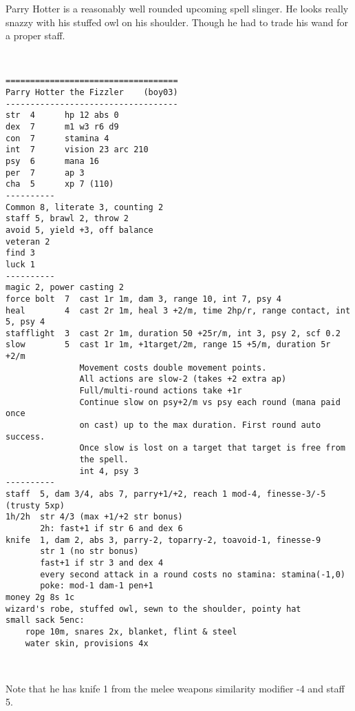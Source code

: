 \clearpage
\begin{samepage}

\noindent Parry Hotter is a reasonably well rounded upcoming spell slinger. He looks really snazzy with his stuffed owl on his shoulder. Though he had to trade his wand for a proper staff.

\

\small \begin{verbatim}
===================================
Parry Hotter the Fizzler    (boy03)
-----------------------------------
str  4      hp 12 abs 0
dex  7      m1 w3 r6 d9
con  7      stamina 4
int  7      vision 23 arc 210
psy  6      mana 16
per  7      ap 3
cha  5      xp 7 (110)
----------
Common 8, literate 3, counting 2
staff 5, brawl 2, throw 2
avoid 5, yield +3, off balance
veteran 2
find 3
luck 1
----------
magic 2, power casting 2
force bolt  7  cast 1r 1m, dam 3, range 10, int 7, psy 4
heal        4  cast 2r 1m, heal 3 +2/m, time 2hp/r, range contact, int 5, psy 4
stafflight  3  cast 2r 1m, duration 50 +25r/m, int 3, psy 2, scf 0.2
slow        5  cast 1r 1m, +1target/2m, range 15 +5/m, duration 5r +2/m
               Movement costs double movement points.
               All actions are slow-2 (takes +2 extra ap)
               Full/multi-round actions take +1r
               Continue slow on psy+2/m vs psy each round (mana paid once
               on cast) up to the max duration. First round auto success.
               Once slow is lost on a target that target is free from
               the spell.
               int 4, psy 3
----------
staff  5, dam 3/4, abs 7, parry+1/+2, reach 1 mod-4, finesse-3/-5   (trusty 5xp)
1h/2h  str 4/3 (max +1/+2 str bonus)
       2h: fast+1 if str 6 and dex 6
knife  1, dam 2, abs 3, parry-2, toparry-2, toavoid-1, finesse-9
       str 1 (no str bonus)
       fast+1 if str 3 and dex 4
       every second attack in a round costs no stamina: stamina(-1,0)
       poke: mod-1 dam-1 pen+1
money 2g 8s 1c
wizard's robe, stuffed owl, sewn to the shoulder, pointy hat
small sack 5enc:
    rope 10m, snares 2x, blanket, flint & steel
    water skin, provisions 4x
\end{verbatim} \end{samepage} \normalsize

\

\noindent Note that he has knife 1 from the melee weapons similarity modifier -4 and staff 5.






